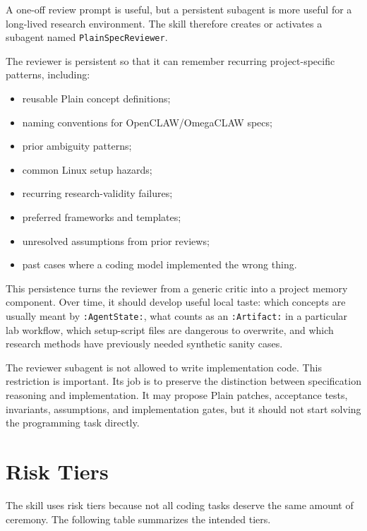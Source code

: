 \documentclass[11pt]{article}
\begin{document}
A one-off review prompt is useful, but a persistent subagent is more useful for a
long-lived research environment. The skill therefore creates or activates a
subagent named \texttt{PlainSpecReviewer}.

The reviewer is persistent so that it can remember recurring project-specific
patterns, including:

\begin{itemize}[nosep]
\item reusable Plain concept definitions;
\item naming conventions for OpenCLAW/OmegaCLAW specs;
\item prior ambiguity patterns;
\item common Linux setup hazards;
\item recurring research-validity failures;
\item preferred frameworks and templates;
\item unresolved assumptions from prior reviews;
\item past cases where a coding model implemented the wrong thing.
\end{itemize}

This persistence turns the reviewer from a generic critic into a project memory
component. Over time, it should develop useful local taste: which concepts are
usually meant by \texttt{:AgentState:}, what counts as an \texttt{:Artifact:} in a
particular lab workflow, which setup-script files are dangerous to overwrite, and
which research methods have previously needed synthetic sanity cases.

The reviewer subagent is not allowed to write implementation code. This
restriction is important. Its job is to preserve the distinction between
specification reasoning and implementation. It may propose Plain patches,
acceptance tests, invariants, assumptions, and implementation gates, but it should
not start solving the programming task directly.

\section{Risk Tiers}

The skill uses risk tiers because not all coding tasks deserve the same amount of
ceremony. The following table summarizes the intended tiers.
\end{document}
